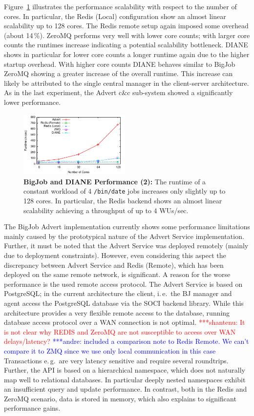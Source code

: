 \documentclass[conference,final]{IEEEtran}
\newcommand{\jhanote}[1]{ {\textcolor{red} { ***shantenu: #1 }}}
\newcommand{\alnote}[1]{ {\textcolor{blue} { ***andre: #1 }}}
\newcommand{\alnote}[1]{}
\newcommand{\jhanote}[1]{}
\begin{document}
Figure~\ref{fig:perf_bigjob-varying-cores} illustrates the performance
scalability with respect to the number of cores. In particular, the Redis
(Local) configuration show an almost linear scalability up to 128 cores. The
Redis remote setup again imposed some overhead (about 14\,\%). ZeroMQ performs
very well with lower core counts; with larger core counts the runtimes increase
indicating a potential scalability bottleneck. DIANE shows in particular for
lower core counts a longer runtime again due to the higher startup overhead.
With higher core counts DIANE behaves similar to BigJob ZeroMQ showing a greater
increase of the overall runtime. This increase can likely be attributed to
the single central manager in the client-server architecture. As in the last
experiment, the Advert c\&c sub-system showed a significantly lower performance.

\begin{figure}[htbp] \centering
\includegraphics[width=0.49\textwidth]{perf/bigjob-varying-cores-alamo.pdf}
\caption{\textbf{BigJob and DIANE Performance (2):}  The
runtime of a constant workload of 4 \texttt{/bin/date} jobs 
increases only slightly up to 128 cores. In particular, the Redis backend shows
an almost linear scalability achieving a throughput of up to 4 WUs/sec. }
\label{fig:perf_bigjob-varying-cores} \end{figure}

The BigJob Advert implementation currently shows some performance limitations
mainly caused by the prototypical nature of the Advert Service implementation.
Further, it must be noted that the Advert Service was deployed remotely (mainly
due to deployment constraints). However, even considering this aspect the
discrepancy between Advert Service and Redis (Remote), which has been deployed
on the same remote network, is significant. A reason for the worse performance 
is the used remote access protocol. The Advert Service is based on
PostgreSQL; in the current architecture the client, i.\,e.\ the BJ
manager and agent access the PostgreSQL database via the SOCI backend
library. While this architecture provides a very flexible remote
access to the database, running database access protocol over a WAN
connection is not optimal. \jhanote{It is not clear why REDIS and
  ZeroMQ are not susceptible to access over WAN delays/latency?}\alnote{included a comparison note to Redis Remote. We can't compare it to ZMQ since we use only
local communication in this case}
Transactions e.\,g.\ are very latency sensitive and require several
roundtrips.  Further, the API is based on a hierarchical namespace,
which does not naturally map well to relational databases. In
particular deeply nested namespaces exhibit an insufficient query and
update performance. In contrast, both in the Redis and ZeroMQ scenario, data is 
stored in memory, which also explains to significant performance gains.
\end{document}
